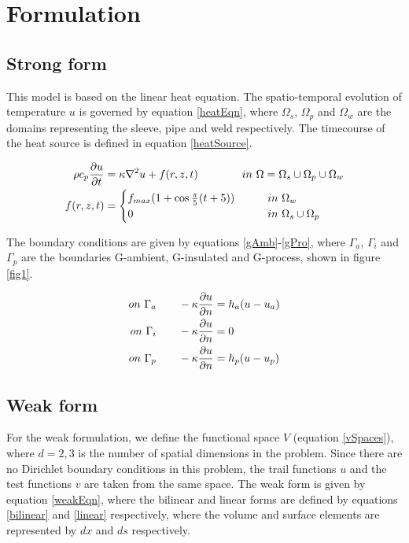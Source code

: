 \documentclass{article}
\begin{document}
\section{Formulation}
\subsection{Strong form}
 This model is based on the linear heat equation. The spatio-temporal evolution of temperature $u$ is governed by equation \ref{heatEqn}, where $\Omega_s$, $\Omega_p$ and $\Omega_w$ are the domains representing the sleeve, pipe and weld respectively. The timecourse of the heat source is defined in equation \ref{heatSource}.
 
\begin{align}
\rho c_p \pdv{u}{t} &= \kappa \laplacian{u} + f(r, z, t) \qquad \qquad in~ \Omega = \Omega_s \cup \Omega_p \cup \Omega_w  \label{heatEqn}   \\
f(r, z, t) &= \begin{cases}
f_{max} (1 + \cos{\frac{\pi}{5}(t + 5)}) \qquad & in ~ \Omega_w \\
0  \qquad & in ~  \Omega_s\cup\Omega_p
\end{cases} \label{heatSource}
\end{align}

The boundary conditions are given by equations \ref{gAmb}-\ref{gPro}, where $\Gamma_a$, $\Gamma_i$ and $\Gamma_p$ are the boundaries G-ambient, G-insulated and G-process, shown in figure \ref{fig1}.

\begin{align}
on ~\Gamma_a \qquad -\kappa \pdv{u}{n} &= h_a(u - u_a)\label{gAmb} \\
on ~\Gamma_i \qquad -\kappa \pdv{u}{n} &= 0\label{gIns} \\
on ~\Gamma_p \qquad -\kappa \pdv{u}{n} &= h_p(u - u_p)\label{gPro}
\end{align}

\subsection{Weak form}
 For the weak formulation, we define the functional space $V$ (equation \ref{vSpaces}), where $d = 2,3$ is the number of spatial dimensions in the problem. Since there are no Dirichlet boundary conditions in this problem, the trail functions $u$ and the test functions $v$ are taken from the same space. The weak form is given by equation \ref{weakEqn}, where the bilinear and linear forms are defined by equations \ref{bilinear} and \ref{linear} respectively, where the volume and surface elements are represented by $dx$ and $ds$ respectively. 
\end{document}
